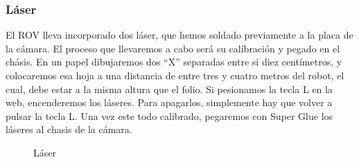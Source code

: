   \subsubsection{Láser}
  \label{subsubsec:laser}
El ROV lleva incorporado dos láser, que hemos soldado previamente a la placa de la cámara. El proceso que llevaremos a cabo será su calibración y pegado en el chásis.
En un papel dibujaremos dos “X” separadas entre si diez centímetros, y colocaremos esa hoja a una distancia de entre tres y cuatro metros del robot, el cual, debe estar a la misma altura que el folio.
Si pesionamos la tecla L en la web, encenderemos los láseres. Para apagarlos, simplemente hay que volver a pulsar la tecla L.
Una vez este todo calibrado, pegaremos con Super Glue los láseres al chasis de la cámara.
 \begin{figure}[hbtp]
  \begin{center}
  \end{center}
  \caption{Láser}
  \label{fig:laser}
\end{figure}
  
